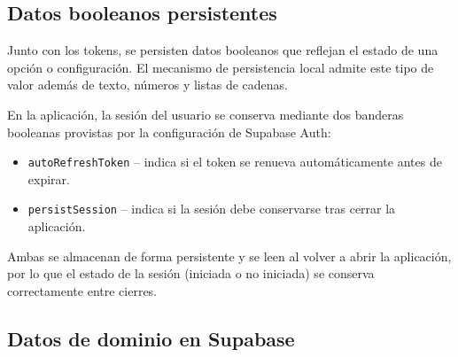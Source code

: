 \begin{figure}[H]
\centering
\end{figure}

\subsection{Datos booleanos persistentes}

Junto con los tokens, se persisten datos booleanos que reflejan el
estado de una opci\'on o configuraci\'on. El mecanismo de
persistencia local admite este tipo de valor adem\'as de texto,
n\'umeros y listas de cadenas.

En la aplicaci\'on, la sesi\'on del usuario se conserva mediante dos
banderas booleanas provistas por la configuraci\'on de Supabase Auth:
\begin{itemize}
  \item \texttt{autoRefreshToken} -- indica si el token se renueva
    autom\'aticamente antes de expirar.
  \item \texttt{persistSession} -- indica si la sesi\'on debe
    conservarse tras cerrar la aplicaci\'on.
\end{itemize}

Ambas se almacenan de forma persistente y se leen al volver a abrir
la aplicaci\'on, por lo que el estado de la sesi\'on (iniciada o no
iniciada) se conserva correctamente entre cierres.

\subsection{Datos de dominio en Supabase}

